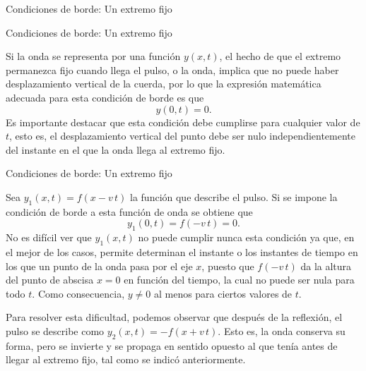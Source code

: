 \documentclass[11pt,handout,aspectratio=1610]{beamer}
\newcommand{\vs}{\vspace{11pt}}
\begin{document}
\begin{frame}{Condiciones de borde: Un extremo fijo}
\end{frame}

\begin{frame}{Condiciones de borde: Un extremo fijo}

    Si la onda se representa por una función $y \left(x,t\right)$, el hecho de que el extremo permanezca fijo cuando llega el pulso, o la onda, implica que no puede haber desplazamiento vertical de la cuerda, por lo que la expresión matemática adecuada para esta condición de borde es que $$ y \left(0,t\right) = 0. $$ Es importante destacar que esta condición debe cumplirse para cualquier valor de $t$, esto es, el desplazamiento vertical del punto debe ser nulo independientemente del instante en el que la onda llega al extremo fijo.

\end{frame}

\begin{frame}{Condiciones de borde: Un extremo fijo}
    
    Sea $y_1 (x,t) = f(x-v \, t)$ la función que describe el pulso. Si se impone la condición de borde a esta función de onda se obtiene que $$y_1 (0,t) = f(-v \, t) = 0. $$ No es difícil ver que $y_1 (x,t)$ no puede cumplir nunca esta condición ya que, en el mejor de los casos, permite determinan el instante o los instantes de tiempo en los que un punto de la onda pasa por el eje $x$, puesto que $f(-v \, t)$ da la altura del punto de abscisa $x=0$ en función del tiempo, la cual no puede ser nula para todo $t$. Como consecuencia, $y \neq 0$ al menos para ciertos valores de $t$.

    \vs

    Para resolver esta dificultad, podemos observar que después de la reflexión, el pulso se describe como $y_2 \left(x,t\right) = -f \left(x+v \, t\right)$. Esto es, la onda conserva su forma, pero se invierte y se propaga en sentido opuesto al que tenía antes de llegar al extremo fijo, tal como se indicó anteriormente.

\end{frame}
\end{document}
